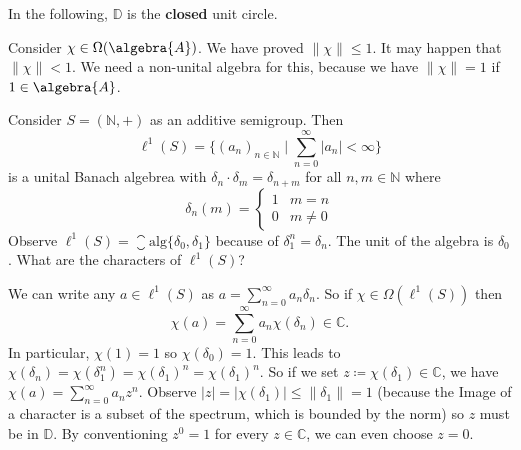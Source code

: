 \documentclass[a4paper]{article}
\begin{document}
In the following, $\mathds{D}$ is the \textbf{closed} unit circle.

\begin{exercise}
	Consider $\chi \in \Omega(\algebra{A})$.
	We have proved $\|\chi\| \leq 1$. 
	It may happen that $\|\chi\| < 1$.
	We need a non-unital algebra for this, because we have $\|\chi\| = 1$ if $1 \in \algebra{A}$.

	Consider $S = (\mathds{N}, +)$ as an additive semigroup. Then
	\begin{equation*}
		\ell^1(S) = \{(a_n)_{n \in \mathds{N}} \mid \sum_{n = 0}^{\infty} |a_n| < \infty\}
	\end{equation*}
	is a unital Banach algebrea with $\delta_n \cdot \delta_m = \delta_{n + m}$ for all $n,m \in \mathds{N}$ where 
	\begin{equation*}
		\delta_n(m) = \left\{ \begin{matrix}
			1 & m = n \\ 0 & m \neq 0
		\end{matrix} \right.
	\end{equation*}
	Observe $\ell^1(S) = \closure{\mathrm{alg}}\{\delta_0, \delta_1\}$ because of $\delta_1^n = \delta_n$.
	The unit of the algebra is $\delta_0$.
	What are the characters of $\ell^1(S)$?

	We can write any $a \in \ell^1(S)$ as $	a = \sum_{n=0}^{\infty} a_n \delta_n$. So if $\chi \in \Omega(\ell^1(S))$ then
	\begin{equation*}
		\chi(a) = \sum_{n = 0}^{\infty} a_n \chi(\delta_n) \in \mathds{C}\text{.}
	\end{equation*}
	In particular, $\chi(1) = 1$ so $\chi(\delta_0) = 1$.
	This leads to $\chi(\delta_n) = \chi(\delta_1^n) = \chi(\delta_1)^n = \chi(\delta_1)^n$.
	So if we set $z \coloneq \chi(\delta_1) \in \mathds{C}$, we have $\chi(a) = \sum_{n = 0}^{\infty} a_n z^n$.
	Observe $|z| = |\chi(\delta_1)| \leq \|\delta_1\| = 1$ (because the Image of a character is a subset of the spectrum, which is bounded by the norm) so $z$ must be in $\mathds{D}$. By conventioning $z^0 = 1$ for every $z \in \mathds{C}$, we can even choose $z = 0$.


\end{exercise}
\end{document}
